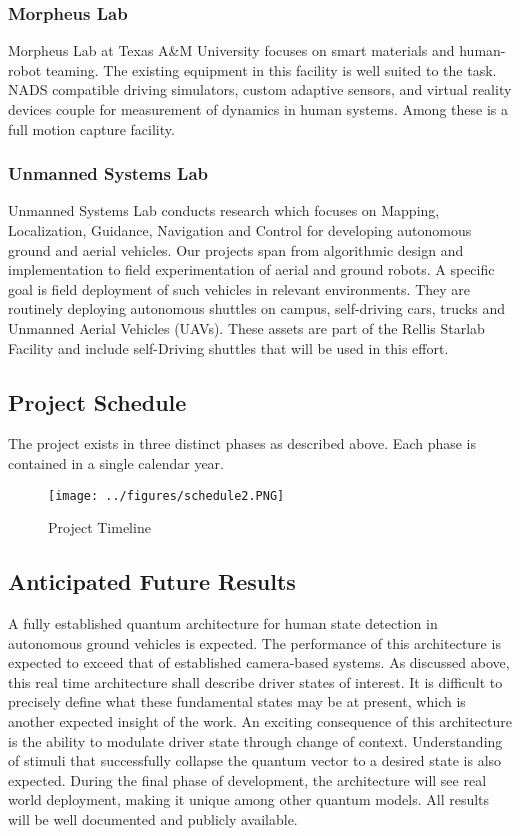 \subsubsection{Morpheus Lab}
Morpheus Lab at Texas A\&M University focuses on smart materials and human-robot teaming. The existing equipment in this facility is well suited to the task. NADS compatible driving simulators, custom adaptive sensors, and virtual reality devices couple for measurement of dynamics in human systems. Among these is a full motion capture facility.  
\subsubsection{Unmanned Systems Lab}
Unmanned Systems Lab conducts research which focuses on Mapping, Localization, Guidance, Navigation and Control for developing autonomous ground and aerial vehicles. Our projects span from algorithmic design and implementation to field experimentation of aerial and ground robots.  A specific goal is field deployment of such vehicles in relevant environments. They are routinely deploying autonomous shuttles on campus, self-driving cars, trucks and Unmanned Aerial Vehicles (UAVs). These assets are part of the Rellis Starlab Facility and include self-Driving shuttles that will be used in this effort.

\subsection{Project Schedule}
The project exists in three distinct phases as described above. Each phase is contained in a single calendar year.
	\begin{figure}[h!]
    \centering
    \texttt{[image: ../figures/schedule2.PNG]}       
    \caption{Project Timeline}
    \end{figure}
\subsection{Anticipated Future Results}
A fully established quantum architecture for human state detection in autonomous ground vehicles is expected. The performance of this architecture is expected to exceed that of established camera-based systems. As discussed above, this real time architecture shall describe driver states of interest. It is difficult to precisely define what these fundamental states may be at present, which is another expected insight of the work. An exciting consequence of this architecture is the ability to modulate driver state through change of context. Understanding of stimuli that successfully collapse the quantum vector to a desired state is also expected. During the final phase of development, the architecture will see real world deployment, making it unique among other quantum models. All results will be well documented and publicly available.
